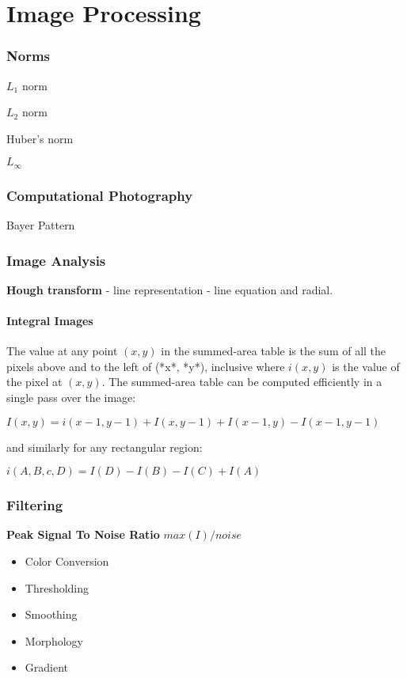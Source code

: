 \part{Image Processing}

\section{Norms}

$L_1$ norm

$L_2$ norm

Huber’s norm

$L_\infty $

\section{Computational Photography}

Bayer Pattern

\section{Image Analysis}

\textbf{Hough transform} - line representation - line equation and radial.

\subsection{Integral Images}

The value at any point $(x, y)$ in the summed-area table is the sum of all the pixels above and to the left of (*x*, *y*), inclusive where $i(x,y)$  is the value of the pixel at $(x,y)$. The summed-area table can be computed efficiently in a single pass over the image:

$I(x,y) = i(x-1,y-1) + I(x,y-1) + I(x-1,y)-I(x-1,y-1)$

and similarly for any rectangular region:

$ i(A,B,c,D) = I(D) - I(B) - I(C)+I(A)$

\section{Filtering}

\textbf{Peak Signal To Noise Ratio} 
$max(I)/noise$


\begin{itemize}
\item Color Conversion
\item Thresholding
\item Smoothing
\item Morphology
\item Gradient
\end{itemize}

